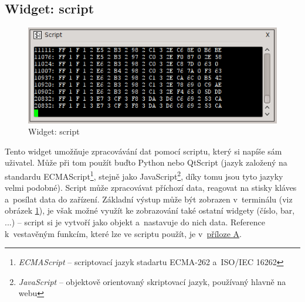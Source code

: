 \documentclass[12pt, a4paper, oneside]{article}
\newcommand{\It}{\textit}  %
\begin{document}
\subsection{Widget: script}
\begin{figure}[h]
\begin{center}
\includegraphics[scale=0.8]{img/w_script.png}
\caption{Widget: script}
\label{script_w}
\end{center}
\end{figure}
Tento widget umožňuje zpracovávání dat pomocí scriptu, který si napíše sám uživatel. Může při tom použít buďto Python nebo QtScript\cite{qtscript} (jazyk založený na standardu ECMAScript\footnote{\It{ECMAScript} -- scriptovací jazyk stadartu ECMA-262 a~ISO/IEC 16262}, stejně jako JavaScript\footnote{\It{JavaScript} -- objektově orientovaný skriptovací jazyk, používaný hlavně na webu}, díky tomu jsou tyto jazyky velmi podobné). Script může zpracovávat příchozí data, reagovat na stisky kláves a~posílat data do zařízení. Základní výstup může být zobrazen v~terminálu (viz obrázek \ref{script_w}), je však možné využít ke zobrazování také ostatní widgety (číslo, bar, ...) -- script si je vytvoří jako objekt a~nastavuje do nich data. Reference k~vestavěným funkcím, které lze ve scriptu použít, je v~\hyperref[script_ref]{příloze A}.
\end{document}
